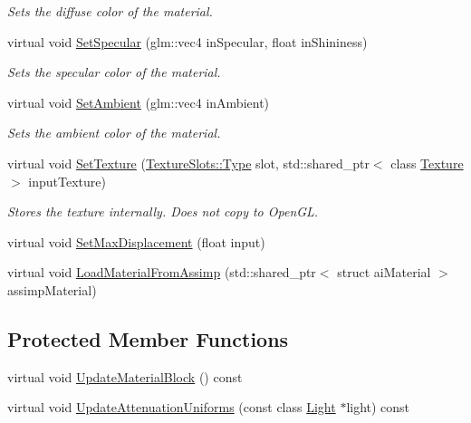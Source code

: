 \begin{DoxyCompactItemize}
\begin{DoxyCompactList}\small\item\em Sets the diffuse color of the material. \end{DoxyCompactList}\item
virtual void \hyperlink{class_blinn_phong_shader_a6567423da36050cc1567919707e8be72}{Set\+Specular} (glm\+::vec4 in\+Specular, float in\+Shininess)
\begin{DoxyCompactList}\small\item\em Sets the specular color of the material. \end{DoxyCompactList}\item
virtual void \hyperlink{class_blinn_phong_shader_a0f8c1c478525dd662922597ea7d9c4ac}{Set\+Ambient} (glm\+::vec4 in\+Ambient)
\begin{DoxyCompactList}\small\item\em Sets the ambient color of the material. \end{DoxyCompactList}\item
virtual void \hyperlink{class_blinn_phong_shader_aa9c8908b300ce1451887945fb961d3b2}{Set\+Texture} (\hyperlink{struct_blinn_phong_shader_1_1_texture_slots_a98940b49ba855ee47d61a6243c05c34d}{Texture\+Slots\+::\+Type} slot, std\+::shared\+\_\+ptr$<$ class \hyperlink{class_texture}{Texture} $>$ input\+Texture)
\begin{DoxyCompactList}\small\item\em Stores the texture internally. Does not copy to Open\+GL. \end{DoxyCompactList}\item
virtual void \hyperlink{class_blinn_phong_shader_acbef23fe1f5ea72a10dc6ded656dacf0}{Set\+Max\+Displacement} (float input)
\item
virtual void \hyperlink{class_blinn_phong_shader_a5a2a720a403f3d005b07a96fee35b95b}{Load\+Material\+From\+Assimp} (std\+::shared\+\_\+ptr$<$ struct ai\+Material $>$ assimp\+Material)
\end{DoxyCompactItemize}
\subsection*{Protected Member Functions}
\begin{DoxyCompactItemize}
\item
virtual void \hyperlink{class_blinn_phong_shader_aa247270120b46431b436220ea6e777be}{Update\+Material\+Block} () const
\item
virtual void \hyperlink{class_blinn_phong_shader_a389b3b5fea85eb6deedfc028c4140632}{Update\+Attenuation\+Uniforms} (const class \hyperlink{class_light}{Light} $\ast$light) const
\end{DoxyCompactItemize}

